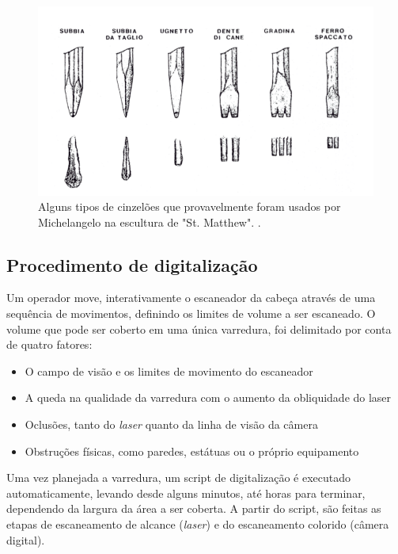 
\begin{figure}[!h]
	\centering
	\includegraphics[width=0.5\linewidth]{figs/ferramentasMich.png}
	\caption{%
	Alguns tipos de cinzelões que provavelmente foram usados por Michelangelo na escultura de "St. Matthew".
	\protect\cite{levoy2000digital}.
	}\label{fig:noite}
\end{figure}

\subsection*{Procedimento de digitalização}

Um operador move, interativamente o escaneador da cabeça através de uma sequência de movimentos, definindo os limites de volume a ser escaneado. O volume que pode ser coberto em uma única varredura, foi delimitado por conta de quatro fatores:
\begin{itemize}
\item{O campo de visão e os limites de movimento do escaneador}
\item{A  queda na qualidade da varredura com o aumento da obliquidade do laser}
\item{Oclusões, tanto do \emph{laser} quanto da linha de visão da câmera}
\item{Obstruções físicas, como paredes, estátuas ou o próprio equipamento}
\end{itemize}

Uma vez planejada a varredura, um script de digitalização é executado automaticamente, levando desde alguns minutos, até horas para terminar, dependendo da largura da área a ser coberta.
A partir do script, são feitas as etapas de escaneamento de alcance (\emph{laser}) e do escaneamento colorido (câmera digital).

